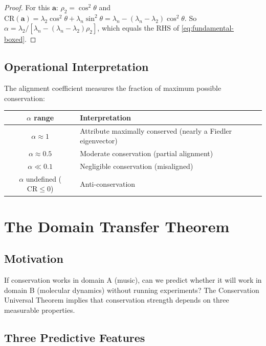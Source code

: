 \documentclass[12pt,letterpaper]{article}
\newcommand{\bfa}{\mathbf{a}}
\newcommand{\CR}{\mathrm{CR}}
\begin{document}
\begin{proof}
For this $\bfa$: $\rho_2 = \cos^2\theta$ and $\CR(\bfa) = \lambda_2 \cos^2\theta + \lambda_n \sin^2\theta = \lambda_n - (\lambda_n - \lambda_2)\cos^2\theta$. So $\alpha = \lambda_2/[\lambda_n - (\lambda_n - \lambda_2)\rho_2]$, which equals the RHS of \eqref{eq:fundamental-boxed}.
\end{proof}

\subsection{Operational Interpretation}

The alignment coefficient measures the fraction of maximum possible conservation:
\medskip

\begin{center}
\begin{tabular}{cl}
  \toprule
  $\alpha$ range & Interpretation \\
  \midrule
  $\alpha \approx 1$ & Attribute maximally conserved (nearly a Fiedler eigenvector) \\
  $\alpha \approx 0.5$ & Moderate conservation (partial alignment) \\
  $\alpha \ll 0.1$ & Negligible conservation (misaligned) \\
  $\alpha$ undefined ($\CR \leq 0$) & Anti-conservation \\
  \bottomrule
\end{tabular}
\end{center}

\section{The Domain Transfer Theorem}
\label{sec:transfer}

\subsection{Motivation}

If conservation works in domain A (music), can we predict whether it will work in domain B (molecular dynamics) without running experiments? The Conservation Universal Theorem implies that conservation strength depends on three measurable properties.

\subsection{Three Predictive Features}
\end{document}
